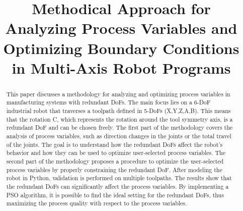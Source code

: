 \documentclass[conference]{IEEEtran}
\begin{document}
\title{Methodical Approach for Analyzing Process
	Variables and Optimizing Boundary Conditions in Multi-Axis Robot Programs
}

\author{
\and
{}
\and
{}
}

\maketitle

\begin{abstract}
This paper discusses a methodology for analyzing and optimizing process variables in manufacturing systems with redundant DoFs. The main focus lies on a 6-DoF industrial robot that traverses a toolpath defined in 5-DoFs (X,Y,Z,A,B). This means that the rotation C, which represents the rotation around the tool symmetry axis, is a redundant DoF and can be chosen freely. The first part of the methodology covers the analysis of process variables, such as direction changes in the joints or the total travel of the joints. The goal is to understand how the redundant DoFs affect the robot's behavior and how they can be used to optimize user-selected process variables. The second part of the methodology proposes a procedure to optimize the user-selected process variables by properly constraining the redundant DoF. After modeling the robot in Python, validation is performed on multiple toolpaths. The results show that the redundant DoFs can significantly affect the process variables. By implementing a PSO algorithm, it is possible to find the ideal setting for the redundant DoFs, thus maximizing the process quality with respect to the process variables.\newline 
\end{abstract}
\end{document}
